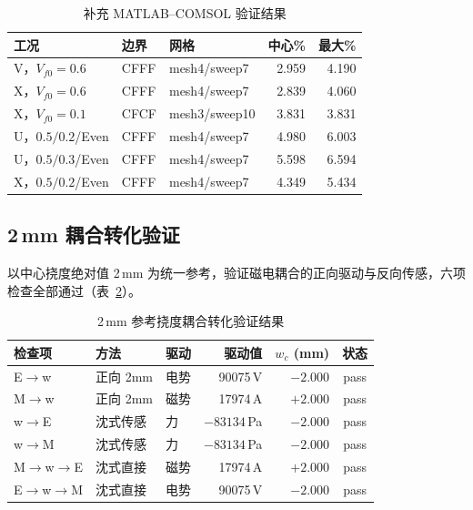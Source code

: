 \documentclass[11pt,a4paper]{ctexart}
\begin{document}
\begin{table}[H]
\centering
\caption{补充 MATLAB--COMSOL 验证结果}
\label{tab:validation-extra-zh}
\small
\begin{tabular}{p{3.2cm}p{1.4cm}p{2.3cm}rr}
\toprule
\textbf{工况} & \textbf{边界} & \textbf{网格} & \textbf{中心\%} & \textbf{最大\%} \\
\midrule
V，$V_{f0}=0.6$ & CFFF & mesh4/sweep7 & 2.959 & 4.190 \\
X，$V_{f0}=0.6$ & CFFF & mesh4/sweep7 & 2.839 & 4.060 \\
X，$V_{f0}=0.1$ & CFCF & mesh3/sweep10 & 3.831 & 3.831 \\
U，$0.5/0.2$/Even & CFFF & mesh4/sweep7 & 4.980 & 6.003 \\
U，$0.5/0.3$/Even & CFFF & mesh4/sweep7 & 5.598 & 6.594 \\
X，$0.5/0.2$/Even & CFFF & mesh4/sweep7 & 4.349 & 5.434 \\
\bottomrule
\end{tabular}
\end{table}

\subsection{2\,mm 耦合转化验证}

以中心挠度绝对值 2\,mm 为统一参考，验证磁电耦合的正向驱动与反向传感，六项检查全部通过（表~\ref{tab:coupling}）。

\begin{table}[H]
\centering
\caption{2\,mm 参考挠度耦合转化验证结果}
\label{tab:coupling}
\small
\begin{tabular}{p{1.8cm}p{2.5cm}lrrc}
\toprule
\textbf{检查项} & \textbf{方法} & \textbf{驱动} & \textbf{驱动值} & $w_c$ (mm) & \textbf{状态} \\
\midrule
E$\to$w & 正向 2mm & 电势 & 90075\,V & $-2.000$ & \textcolor{passgreen}{pass} \\
M$\to$w & 正向 2mm & 磁势 & 17974\,A & $+2.000$ & \textcolor{passgreen}{pass} \\
w$\to$E & 沈式传感 & 力 & $-83134$\,Pa & $-2.000$ & \textcolor{passgreen}{pass} \\
w$\to$M & 沈式传感 & 力 & $-83134$\,Pa & $-2.000$ & \textcolor{passgreen}{pass} \\
M$\to$w$\to$E & 沈式直接 & 磁势 & 17974\,A & $+2.000$ & \textcolor{passgreen}{pass} \\
E$\to$w$\to$M & 沈式直接 & 电势 & 90075\,V & $-2.000$ & \textcolor{passgreen}{pass} \\
\bottomrule
\end{tabular}
\end{table}
\end{document}
